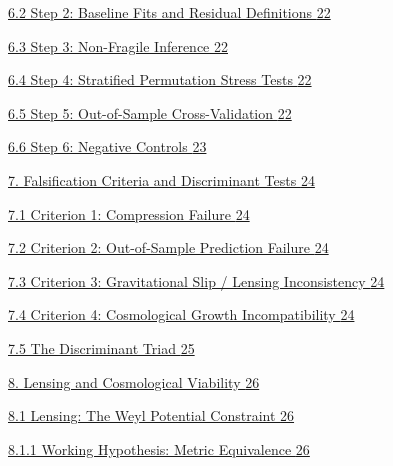 \documentclass[11pt]{article}
\begin{document}
\hyperref[step-2-baseline-fits-and-residual-definitions]{6.2 Step 2: Baseline Fits and Residual Definitions \hyperref[step-2-baseline-fits-and-residual-definitions]{22}}

\hyperref[step-3-non-fragile-inference]{6.3 Step 3: Non-Fragile Inference \hyperref[step-3-non-fragile-inference]{22}}

\hyperref[step-4-stratified-permutation-stress-tests]{6.4 Step 4: Stratified Permutation Stress Tests \hyperref[step-4-stratified-permutation-stress-tests]{22}}

\hyperref[step-5-out-of-sample-cross-validation]{6.5 Step 5: Out-of-Sample Cross-Validation \hyperref[step-5-out-of-sample-cross-validation]{22}}

\hyperref[step-6-negative-controls]{6.6 Step 6: Negative Controls \hyperref[step-6-negative-controls]{23}}

\hyperref[falsification-criteria-and-discriminant-tests]{7. Falsification Criteria and Discriminant Tests \hyperref[falsification-criteria-and-discriminant-tests]{24}}

\hyperref[criterion-1-compression-failure]{7.1 Criterion 1: Compression Failure \hyperref[criterion-1-compression-failure]{24}}

\hyperref[criterion-2-out-of-sample-prediction-failure]{7.2 Criterion 2: Out-of-Sample Prediction Failure \hyperref[criterion-2-out-of-sample-prediction-failure]{24}}

\hyperref[criterion-3-gravitational-slip-lensing-inconsistency]{7.3 Criterion 3: Gravitational Slip / Lensing Inconsistency \hyperref[criterion-3-gravitational-slip-lensing-inconsistency]{24}}

\hyperref[criterion-4-cosmological-growth-incompatibility]{7.4 Criterion 4: Cosmological Growth Incompatibility \hyperref[criterion-4-cosmological-growth-incompatibility]{24}}

\hyperref[the-discriminant-triad]{7.5 The Discriminant Triad \hyperref[the-discriminant-triad]{25}}

\hyperref[lensing-and-cosmological-viability]{8. Lensing and Cosmological Viability \hyperref[lensing-and-cosmological-viability]{26}}

\hyperref[lensing-the-weyl-potential-constraint]{8.1 Lensing: The Weyl Potential Constraint \hyperref[lensing-the-weyl-potential-constraint]{26}}

\hyperref[working-hypothesis-metric-equivalence]{8.1.1 Working Hypothesis: Metric Equivalence \hyperref[working-hypothesis-metric-equivalence]{26}}
\end{document}
